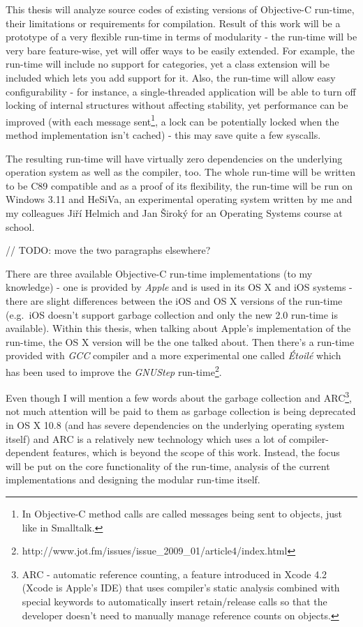 This thesis will analyze source codes of existing versions of Objective-C run-time, their limitations or requirements for compilation. Result of this work will be a prototype of a very flexible run-time in terms of modularity - the run-time will be very bare feature-wise, yet will offer ways to be easily extended. For example, the run-time will include no support for categories, yet a class extension will be included which lets you add support for it. Also, the run-time will allow easy configurability - for instance, a single-threaded application will be able to turn off locking of internal structures without affecting stability, yet performance can be improved (with each message sent\footnote{In Objective-C method calls are called messages being sent to objects, just like in Smalltalk.}, a lock can be potentially locked when the method implementation isn't cached) - this may save quite a few syscalls.

The resulting run-time will have virtually zero dependencies on the underlying operation system as well as the compiler, too. The whole run-time will be written to be C89 compatible and as a proof of its flexibility, the run-time will be run on Windows 3.11 and HeSiVa, an experimental operating system written by me and my colleagues Jiří Helmich and Jan Široký for an Operating Systems course at school. 


// TODO: move the two paragraphs elsewhere?

There are three available Objective-C run-time implementations (to my knowledge) - one is provided by \emph{Apple} and is used in its OS X and iOS systems - there are slight differences between the iOS and OS X versions of the run-time (e.g.\ iOS doesn't support garbage collection and only the new 2.0 run-time is available). Within this thesis, when talking about Apple's implementation of the run-time, the OS X version will be the one talked about. Then there's a run-time provided with \emph{GCC} compiler and a more experimental one called \emph{\'{E}toil\'{e}} which has been used to improve the \emph{GNUStep} run-time\footnote{http://www.jot.fm/issues/issue\_2009\_01/article4/index.html}.

Even though I will mention a few words about the garbage collection and ARC\footnote{ARC - automatic reference counting, a feature introduced in Xcode 4.2 (Xcode is Apple's IDE) that uses compiler's static analysis combined with special keywords to automatically insert retain/release calls so that the developer doesn't need to manually manage reference counts on objects.}, not much attention will be paid to them as garbage collection is being deprecated in OS X 10.8 (and has severe dependencies on the underlying operating system itself) and ARC is a relatively new technology which uses a lot of compiler-dependent features, which is beyond the scope of this work. Instead, the focus will be put on the core functionality of the run-time, analysis of the current implementations and designing the modular run-time itself.
